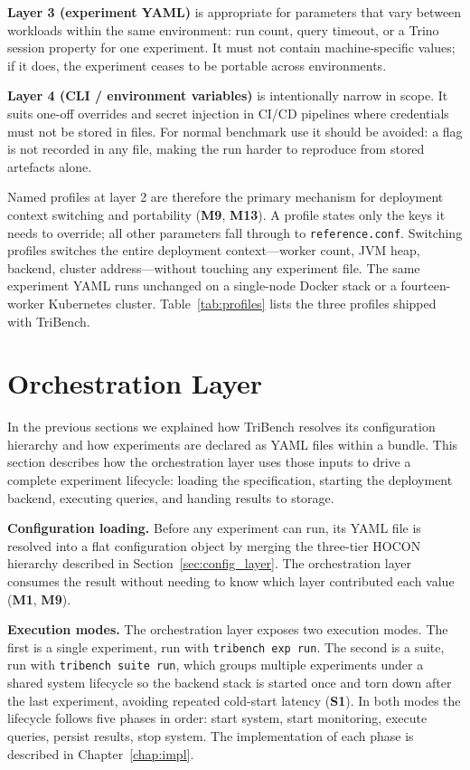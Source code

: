 \documentclass{l4proj}
\begin{document}
\textbf{Layer 3 (experiment YAML)} is appropriate for parameters that vary between workloads within the same environment: run count, query timeout, or a Trino session property for one experiment. It must not contain machine-specific values; if it does, the experiment ceases to be portable across environments.

\textbf{Layer 4 (CLI / environment variables)} is intentionally narrow in scope. It suits one-off overrides and secret injection in CI/CD pipelines where credentials must not be stored in files. For normal benchmark use it should be avoided: a flag is not recorded in any file, making the run harder to reproduce from stored artefacts alone.

Named profiles at layer 2 are therefore the primary mechanism for deployment context switching and portability (\textbf{M9}, \textbf{M13}). A profile states only the keys it needs to override; all other parameters fall through to \texttt{reference.conf}. Switching profiles switches the entire deployment context---worker count, JVM heap, backend, cluster address---without touching any experiment file. The same experiment YAML runs unchanged on a single-node Docker stack or a fourteen-worker Kubernetes cluster. Table~\ref{tab:profiles} lists the three profiles shipped with TriBench.


\section{Orchestration Layer}
\label{sec:orchestration_layer}

In the previous sections we explained how TriBench resolves its configuration hierarchy and how experiments are declared as YAML files within a bundle. This section describes how the orchestration layer uses those inputs to drive a complete experiment lifecycle: loading the specification, starting the deployment backend, executing queries, and handing results to storage.

\textbf{Configuration loading.} Before any experiment can run, its YAML file is resolved into a flat configuration object by merging the three-tier HOCON hierarchy described in Section~\ref{sec:config_layer}. The orchestration layer consumes the result without needing to know which layer contributed each value (\textbf{M1}, \textbf{M9}).

\textbf{Execution modes.} The orchestration layer exposes two execution modes. The first is a single experiment, run with \texttt{tribench exp run}. The second is a suite, run with \texttt{tribench suite run}, which groups multiple experiments under a shared system lifecycle so the backend stack is started once and torn down after the last experiment, avoiding repeated cold-start latency (\textbf{S1}). In both modes the lifecycle follows five phases in order: start system, start monitoring, execute queries, persist results, stop system. The implementation of each phase is described in Chapter~\ref{chap:impl}.
\end{document}
